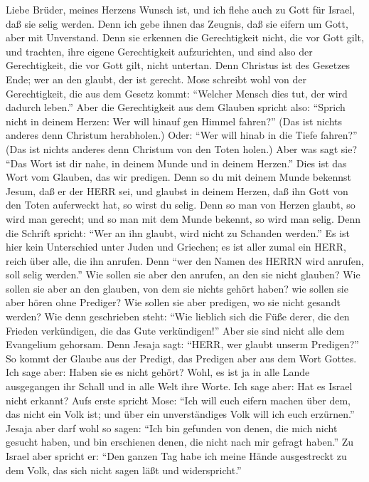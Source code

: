  Liebe Brüder, meines Herzens Wunsch ist, und ich flehe auch
zu Gott für Israel, daß sie selig werden.  Denn ich gebe
ihnen das Zeugnis, daß sie eifern um Gott, aber mit Unverstand.
 Denn sie erkennen die Gerechtigkeit nicht, die vor Gott
gilt, und trachten, ihre eigene Gerechtigkeit aufzurichten, und sind
also der Gerechtigkeit, die vor Gott gilt, nicht untertan. 
Denn Christus ist des Gesetzes Ende; wer an den glaubt, der ist gerecht.
 Mose schreibt wohl von der Gerechtigkeit, die aus dem
Gesetz kommt: ``Welcher Mensch dies tut, der wird dadurch leben.''
 Aber die Gerechtigkeit aus dem Glauben spricht also:
``Sprich nicht in deinem Herzen: Wer will hinauf gen Himmel fahren?''
(Das ist nichts anderes denn Christum herabholen.)  Oder:
``Wer will hinab in die Tiefe fahren?'' (Das ist nichts anderes denn
Christum von den Toten holen.)  Aber was sagt sie? ``Das
Wort ist dir nahe, in deinem Munde und in deinem Herzen.'' Dies ist das
Wort vom Glauben, das wir predigen.  Denn so du mit deinem
Munde bekennst Jesum, daß er der HERR sei, und glaubst in deinem Herzen,
daß ihn Gott von den Toten auferweckt hat, so wirst du selig.
 Denn so man von Herzen glaubt, so wird man gerecht; und so
man mit dem Munde bekennt, so wird man selig.  Denn die
Schrift spricht: ``Wer an ihn glaubt, wird nicht zu Schanden werden.''
 Es ist hier kein Unterschied unter Juden und Griechen; es
ist aller zumal ein HERR, reich über alle, die ihn anrufen.
 Denn ``wer den Namen des HERRN wird anrufen, soll selig
werden.''  Wie sollen sie aber den anrufen, an den sie
nicht glauben? Wie sollen sie aber an den glauben, von dem sie nichts
gehört haben? wie sollen sie aber hören ohne Prediger?  Wie
sollen sie aber predigen, wo sie nicht gesandt werden? Wie denn
geschrieben steht: ``Wie lieblich sich die Füße derer, die den Frieden
verkündigen, die das Gute verkündigen!''  Aber sie sind
nicht alle dem Evangelium gehorsam. Denn Jesaja sagt: ``HERR, wer glaubt
unserm Predigen?''  So kommt der Glaube aus der Predigt,
das Predigen aber aus dem Wort Gottes.  Ich sage aber:
Haben sie es nicht gehört? Wohl, es ist ja in alle Lande ausgegangen ihr
Schall und in alle Welt ihre Worte.  Ich sage aber: Hat es
Israel nicht erkannt? Aufs erste spricht Mose: ``Ich will euch eifern
machen über dem, das nicht ein Volk ist; und über ein unverständiges
Volk will ich euch erzürnen.''  Jesaja aber darf wohl so
sagen: ``Ich bin gefunden von denen, die mich nicht gesucht haben, und
bin erschienen denen, die nicht nach mir gefragt haben.'' 
Zu Israel aber spricht er: ``Den ganzen Tag habe ich meine Hände
ausgestreckt zu dem Volk, das sich nicht sagen läßt und widerspricht.''

